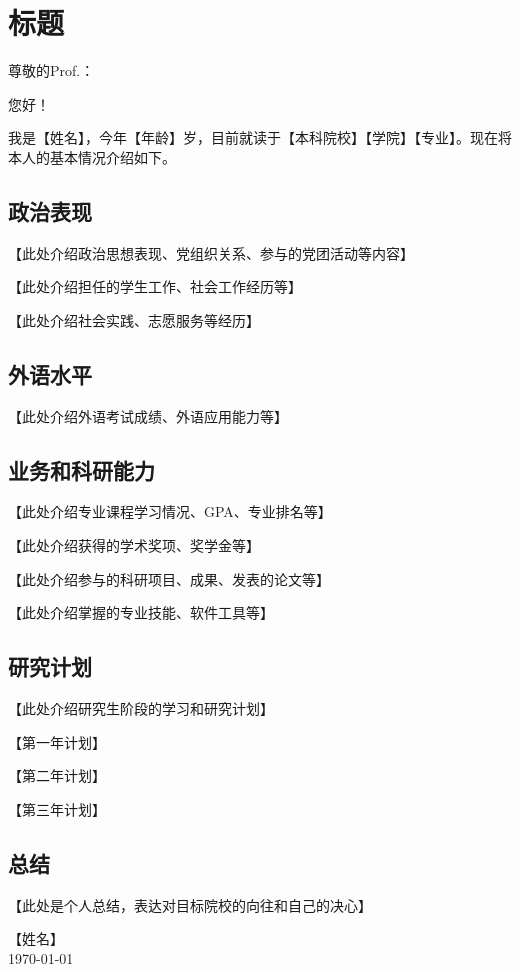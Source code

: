 \documentclass[a4paper]{article}
\begin{document}
\section{标题}

\noindent 尊敬的Prof.：

您好！

我是【姓名】，今年【年龄】岁，目前就读于【本科院校】【学院】【专业】。现在将本人的基本情况介绍如下。

\subsection{政治表现}

【此处介绍政治思想表现、党组织关系、参与的党团活动等内容】

【此处介绍担任的学生工作、社会工作经历等】

【此处介绍社会实践、志愿服务等经历】

\subsection{外语水平}

【此处介绍外语考试成绩、外语应用能力等】

\subsection{业务和科研能力}

【此处介绍专业课程学习情况、GPA、专业排名等】

【此处介绍获得的学术奖项、奖学金等】

【此处介绍参与的科研项目、成果、发表的论文等】

【此处介绍掌握的专业技能、软件工具等】

\subsection{研究计划}

【此处介绍研究生阶段的学习和研究计划】

【第一年计划】

【第二年计划】

【第三年计划】

\subsection{总结}

【此处是个人总结，表达对目标院校的向往和自己的决心】

\begin{flushright}
  【姓名】\\
  \today
\end{flushright}
\end{document}
